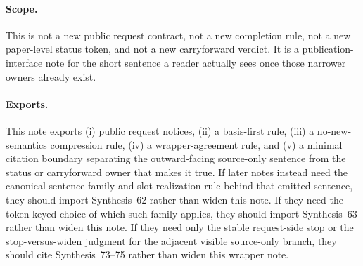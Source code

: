 \documentclass[11pt]{article}
\begin{document}
\paragraph{Scope.}
This is not a new public request contract, not a new completion rule, not a new paper-level status token, and not a new carryforward verdict.
It is a publication-interface note for the short sentence a reader actually sees once those narrower owners already exist.

\paragraph{Exports.}
This note exports (i) public request notices, (ii) a basis-first rule, (iii) a no-new-semantics compression rule, (iv) a wrapper-agreement rule, and (v) a minimal citation boundary separating the outward-facing source-only sentence from the status or carryforward owner that makes it true. If later notes instead need the canonical sentence family and slot realization rule behind that emitted sentence, they should import Synthesis~62 rather than widen this note. If they need the token-keyed choice of which such family applies, they should import Synthesis~63 rather than widen this note. If they need only the stable request-side stop or the stop-versus-widen judgment for the adjacent visible source-only branch, they should cite Synthesis~73--75 rather than widen this wrapper note.
\end{document}
